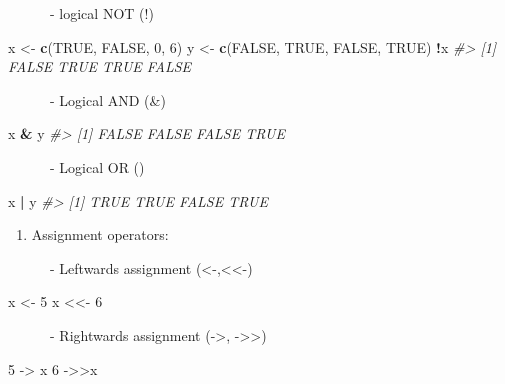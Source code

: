 \documentclass[
]{book}
\newenvironment{Shaded}{\begin{snugshade}}{\end{snugshade}}
\newcommand{\CommentTok}[1]{\textcolor[rgb]{0.56,0.35,0.01}{\textit{#1}}}
\newcommand{\ConstantTok}[1]{\textcolor[rgb]{0.56,0.35,0.01}{#1}}
\newcommand{\DecValTok}[1]{\textcolor[rgb]{0.00,0.00,0.81}{#1}}
\newcommand{\FunctionTok}[1]{\textcolor[rgb]{0.13,0.29,0.53}{\textbf{#1}}}
\newcommand{\NormalTok}[1]{#1}
\newcommand{\OtherTok}[1]{\textcolor[rgb]{0.56,0.35,0.01}{#1}}
\newcommand{\SpecialCharTok}[1]{\textcolor[rgb]{0.81,0.36,0.00}{\textbf{#1}}}
\providecommand{\tightlist}{%
  \setlength{\itemsep}{0pt}\setlength{\parskip}{0pt}}
\begin{document}
~~~~~~- logical NOT (!)

\begin{Shaded}
\begin{Highlighting}[]
\NormalTok{x }\OtherTok{\textless{}{-}} \FunctionTok{c}\NormalTok{(}\ConstantTok{TRUE}\NormalTok{, }\ConstantTok{FALSE}\NormalTok{, }\DecValTok{0}\NormalTok{, }\DecValTok{6}\NormalTok{)}
\NormalTok{y }\OtherTok{\textless{}{-}} \FunctionTok{c}\NormalTok{(}\ConstantTok{FALSE}\NormalTok{, }\ConstantTok{TRUE}\NormalTok{, }\ConstantTok{FALSE}\NormalTok{, }\ConstantTok{TRUE}\NormalTok{)}
\SpecialCharTok{!}\NormalTok{x}
\CommentTok{\#\textgreater{} [1] FALSE  TRUE  TRUE FALSE}
\end{Highlighting}
\end{Shaded}

~~~~~~- Logical AND (\&)

\begin{Shaded}
\begin{Highlighting}[]
\NormalTok{x }\SpecialCharTok{\&}\NormalTok{ y}
\CommentTok{\#\textgreater{} [1] FALSE FALSE FALSE  TRUE}
\end{Highlighting}
\end{Shaded}

~~~~~~- Logical OR (\textbar)

\begin{Shaded}
\begin{Highlighting}[]
\NormalTok{x }\SpecialCharTok{|}\NormalTok{ y}
\CommentTok{\#\textgreater{} [1]  TRUE  TRUE FALSE  TRUE}
\end{Highlighting}
\end{Shaded}

\begin{enumerate}
\def\labelenumi{\arabic{enumi}.}
\setcounter{enumi}{3}
\tightlist
\item
  Assignment operators:
\end{enumerate}

~~~~~~- Leftwards assignment (\textless-,\textless\textless-)

\begin{Shaded}
\begin{Highlighting}[]
\NormalTok{x }\OtherTok{\textless{}{-}} \DecValTok{5}
\NormalTok{x }\OtherTok{\textless{}\textless{}{-}} \DecValTok{6}
\end{Highlighting}
\end{Shaded}

~~~~~~- Rightwards assignment (-\textgreater, -\textgreater\textgreater)

\begin{Shaded}
\begin{Highlighting}[]
\DecValTok{5} \OtherTok{{-}\textgreater{}}\NormalTok{ x}
\DecValTok{6} \OtherTok{{-}\textgreater{}\textgreater{}}\NormalTok{x}
\end{Highlighting}
\end{Shaded}
\end{document}
